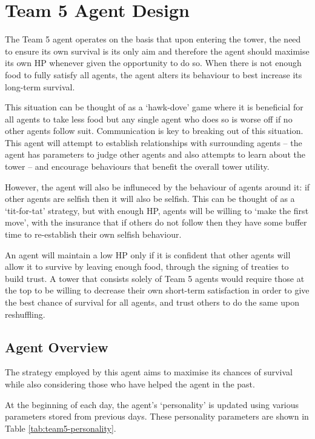 \chapter{Team 5 Agent Design}\label{team_5_agent_design}

The Team 5 agent operates on the basis that upon entering the tower, the need to ensure its own survival is its only aim and therefore the agent should maximise its own HP whenever given the opportunity to do so. When there is not enough food to fully satisfy all agents, the agent alters its behaviour to best increase its long-term survival.

This situation can be thought of as a `hawk-dove' game where it is beneficial for all agents to take less food but any single agent who does so is worse off if no other agents follow suit. Communication is key to breaking out of this situation. This agent will attempt to establish relationships with surrounding agents -- the agent has parameters to judge other agents and also attempts to learn about the tower -- and encourage behaviours that benefit the overall tower utility.

However, the agent will also be influneced by the behaviour of agents around it: if other agents are selfish then it will also be selfish. This can be thought of as a `tit-for-tat' strategy, but with enough HP, agents will be willing to `make the first move', with the insurance that if others do not follow then they have some buffer time to re-establish their own selfish behaviour.

An agent will maintain a low HP only if it is confident that other agents will allow it to survive by leaving enough food, through the signing of treaties to build trust. A tower that consists solely of Team 5 agents would require those at the top to be willing to decrease their own short-term satisfaction in order to give the best chance of survival for all agents, and trust others to do the same upon reshuffling.

\section{Agent Overview}
\label{sec:team5-overview}

The strategy employed by this agent aims to maximise its chances of survival while also considering those who have helped the agent in the past.

At the beginning of each day, the agent's `personality' is updated using various parameters stored from previous days. These personality parameters are shown in Table \ref{tab:team5-personality}.

